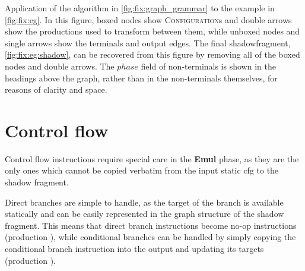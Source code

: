 \begin{sanefig}
\begin{tikzpicture}
  \end{tikzpicture}
  \caption{Application of the algorithm in
    \autoref{fig:fix:graph_grammar} to the example in
    \autoref{fig:fix:eg}.  In this figure, boxed nodes show
    \textsc{Configuration}s and double arrows show the productions
    used to transform between them, while unboxed nodes and single
    arrows show the terminals and output edges.  The final
    \protect\gls{shadowfragment}, \autoref{fig:fix:eg:shadow}, can be
    recovered from this figure by removing all of the boxed nodes and
    double arrows.  The $\mathit{phase}$ field of non-terminals is
    shown in the headings above the graph, rather than in the
    non-terminals themselves, for reasons of clarity and space.}
  \label{fig:fix:eg:application}
\end{sanefig}

\section{Control flow}
Control flow instructions require special care in the \textbf{Emul}
phase, as they are the only ones which cannot be copied verbatim from
the input static \gls{cfg} to the shadow fragment.

Direct branches are simple to handle, as the target of the branch is
available statically and can be easily represented in the graph
structure of the shadow fragment.  This means that direct branch
instructions become no-op instructions (production ),
while conditional branches can be handled by simply copying the
conditional branch instruction into the output and updating its
targets (production ).

